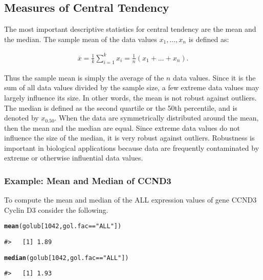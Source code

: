 \documentclass{article}\usepackage[]{graphicx}\usepackage[usenames,dvipsnames]{color}
\makeatletter
\newcommand{\hlnum}[1]{\textcolor[rgb]{0.686,0.059,0.569}{#1}}%
\newcommand{\hlstr}[1]{\textcolor[rgb]{0.192,0.494,0.8}{#1}}%
\newcommand{\hlopt}[1]{\textcolor[rgb]{0,0,0}{#1}}%
\newcommand{\hlstd}[1]{\textcolor[rgb]{0.345,0.345,0.345}{#1}}%
\newcommand{\hlkwd}[1]{\textcolor[rgb]{0.737,0.353,0.396}{\textbf{#1}}}%
\newenvironment{kframe}{%
 \def\at@end@of@kframe{}%
 \ifinner\ifhmode%
  \def\at@end@of@kframe{\end{minipage}}%
  \begin{minipage}{\columnwidth}%
 \fi\fi%
 \def\FrameCommand##1{\hskip\@totalleftmargin \hskip-\fboxsep
 \colorbox{shadecolor}{##1}\hskip-\fboxsep
     \hskip-\linewidth \hskip-\@totalleftmargin \hskip\columnwidth}%
 \MakeFramed {\advance\hsize-\width
   \@totalleftmargin\z@ \linewidth\hsize
   \@setminipage}}%
 {\par\unskip\endMakeFramed%
 \at@end@of@kframe}
\newenvironment{knitrout}{}{} %
\makeatother
\begin{document}
\subsection{Measures of Central Tendency}
The most important descriptive statistics for central tendency are the mean
and the median. The sample mean of the data values $x_1, \dotsc, x_n$ is defined
as:

\begin{gather*}
\overline x =\frac{1}{k} \sum_{i=1}^k x_{i}
= \frac{1}{n} \left( x_{1} + \dotso + x_{n}\right).
\end{gather*}

Thus the sample mean is simply the average of the $n$ data values. Since it
is the sum of all data values divided by the sample size, a few extreme data
values may largely influence its size. In other words, the mean is not robust
against outliers. \\

The median is defined as the second quartile or the 50th percentile, and
is denoted by $x_{0.50}$. When the data are symmetrically distributed around the
mean, then the mean and the median are equal. Since extreme data values
do not influence the size of the median, it is very robust against outliers.
Robustness is important in biological applications because data are frequently contaminated 
by extreme or otherwise influential data values.

\subsubsection*{Example: Mean and Median of CCND3} 
To compute the mean and median of the ALL expression
values of gene CCND3 Cyclin D3 consider the following.


\begin{knitrout}
\color{fgcolor}\begin{kframe}
\begin{alltt}
\hlkwd{mean}\hlstd{(golub[}\hlnum{1042}\hlstd{, gol.fac}\hlopt{==}\hlstr{"ALL"}\hlstd{])}
\end{alltt}
\begin{verbatim}
#>   [1] 1.89
\end{verbatim}
\begin{alltt}
\hlkwd{median}\hlstd{(golub[}\hlnum{1042}\hlstd{, gol.fac}\hlopt{==}\hlstr{"ALL"}\hlstd{])}
\end{alltt}
\begin{verbatim}
#>   [1] 1.93
\end{verbatim}
\end{kframe}
\end{knitrout}
\end{document}
